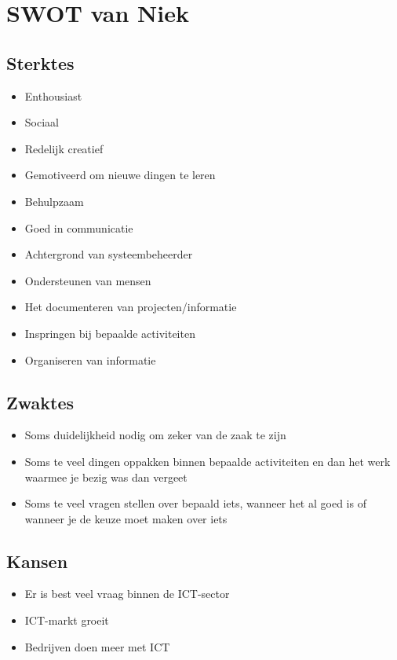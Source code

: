 \documentclass[11pt,oneside,a4paper,numbers=enddot]{report} %
\begin{document}
\section{SWOT van Niek}

\subsection{Sterktes}

\begin{itemize}
\item
  Enthousiast
\item
  Sociaal
\item
  Redelijk creatief
\item
  Gemotiveerd om nieuwe dingen te leren
\item
  Behulpzaam
\item
  Goed in communicatie
\item
  Achtergrond van systeembeheerder
\item
  Ondersteunen van mensen
\item
  Het documenteren van projecten/informatie
\item
  Inspringen bij bepaalde activiteiten
\item
  Organiseren van informatie
\end{itemize}

\subsection{Zwaktes}

\begin{itemize}
\item
  Soms duidelijkheid nodig om zeker van de zaak te zijn
\item
  Soms te veel dingen oppakken
  binnen bepaalde activiteiten
  en dan het werk waarmee je bezig was dan vergeet
\item
  Soms te veel vragen stellen over bepaald iets,
  wanneer het al goed is of
  wanneer je de keuze moet maken over iets
\end{itemize}
  
\subsection{Kansen}

\begin{itemize}
\item
  Er is best veel vraag binnen de ICT-sector
\item
  ICT-markt groeit
\item
  Bedrijven doen meer met ICT
\end{itemize}
\end{document}
